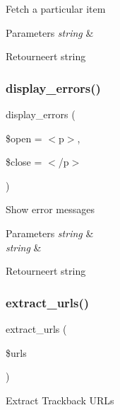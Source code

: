 Fetch a particular item


\begin{DoxyParams}{Parameters}
{\em string} & \\
\hline
\end{DoxyParams}
\begin{DoxyReturn}{Retourneert}
string 
\end{DoxyReturn}
\mbox{\label{class_c_i___trackback_a71a6f2e6d97ff5347257f101002bc903}} 
\subsubsection{\texorpdfstring{display\_errors()}{display\_errors()}}
{\footnotesize\ttfamily display\+\_\+errors (\begin{DoxyParamCaption}\item[{}]{\$open = {\ttfamily \textquotesingle{}$<$p$>$\textquotesingle{}},  }\item[{}]{\$close = {\ttfamily \textquotesingle{}$<$/p$>$\textquotesingle{}} }\end{DoxyParamCaption})}

Show error messages


\begin{DoxyParams}{Parameters}
{\em string} & \\
\hline
{\em string} & \\
\hline
\end{DoxyParams}
\begin{DoxyReturn}{Retourneert}
string 
\end{DoxyReturn}
\mbox{\label{class_c_i___trackback_aab29f333201544b83e318dd761ac797a}} 
\subsubsection{\texorpdfstring{extract\_urls()}{extract\_urls()}}
{\footnotesize\ttfamily extract\+\_\+urls (\begin{DoxyParamCaption}\item[{}]{\$urls }\end{DoxyParamCaption})}

Extract Trackback U\+R\+Ls

